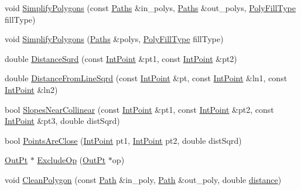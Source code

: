 \begin{DoxyCompactItemize}
\item 
void \mbox{\hyperlink{namespace_clipper_lib_ac9ebbe437e4c08816bffeced6d001cf6}{Simplify\+Polygons}} (const \mbox{\hyperlink{namespace_clipper_lib_a4bab1d9e10805fa6f1fd3b78c56efcfe}{Paths}} \&in\+\_\+polys, \mbox{\hyperlink{namespace_clipper_lib_a4bab1d9e10805fa6f1fd3b78c56efcfe}{Paths}} \&out\+\_\+polys, \mbox{\hyperlink{namespace_clipper_lib_a95a41ff8fa6b351d304829c267d638d7}{Poly\+Fill\+Type}} fill\+Type)
\item 
void \mbox{\hyperlink{namespace_clipper_lib_ac43b677f95d30bd595bbdd5eb79cdcec}{Simplify\+Polygons}} (\mbox{\hyperlink{namespace_clipper_lib_a4bab1d9e10805fa6f1fd3b78c56efcfe}{Paths}} \&polys, \mbox{\hyperlink{namespace_clipper_lib_a95a41ff8fa6b351d304829c267d638d7}{Poly\+Fill\+Type}} fill\+Type)
\item 
double \mbox{\hyperlink{namespace_clipper_lib_ab3ea29b9e123ab56ede03ce6946c9e7d}{Distance\+Sqrd}} (const \mbox{\hyperlink{struct_clipper_lib_1_1_int_point}{Int\+Point}} \&pt1, const \mbox{\hyperlink{struct_clipper_lib_1_1_int_point}{Int\+Point}} \&pt2)
\item 
double \mbox{\hyperlink{namespace_clipper_lib_ac57923512d57903663fed9778585ca18}{Distance\+From\+Line\+Sqrd}} (const \mbox{\hyperlink{struct_clipper_lib_1_1_int_point}{Int\+Point}} \&pt, const \mbox{\hyperlink{struct_clipper_lib_1_1_int_point}{Int\+Point}} \&ln1, const \mbox{\hyperlink{struct_clipper_lib_1_1_int_point}{Int\+Point}} \&ln2)
\item 
bool \mbox{\hyperlink{namespace_clipper_lib_a6a8d461810e4bcb5c67bf8e3026839b6}{Slopes\+Near\+Collinear}} (const \mbox{\hyperlink{struct_clipper_lib_1_1_int_point}{Int\+Point}} \&pt1, const \mbox{\hyperlink{struct_clipper_lib_1_1_int_point}{Int\+Point}} \&pt2, const \mbox{\hyperlink{struct_clipper_lib_1_1_int_point}{Int\+Point}} \&pt3, double dist\+Sqrd)
\item 
bool \mbox{\hyperlink{namespace_clipper_lib_a52757887bc031d0052ae95dccb83cd2c}{Points\+Are\+Close}} (\mbox{\hyperlink{struct_clipper_lib_1_1_int_point}{Int\+Point}} pt1, \mbox{\hyperlink{struct_clipper_lib_1_1_int_point}{Int\+Point}} pt2, double dist\+Sqrd)
\item 
\mbox{\hyperlink{struct_clipper_lib_1_1_out_pt}{Out\+Pt}} $\ast$ \mbox{\hyperlink{namespace_clipper_lib_a5d4e245ecf47a87cf3c88876f55ab3a3}{Exclude\+Op}} (\mbox{\hyperlink{struct_clipper_lib_1_1_out_pt}{Out\+Pt}} $\ast$op)
\item 
void \mbox{\hyperlink{namespace_clipper_lib_a9246a3146ac112581e82be58e158be7b}{Clean\+Polygon}} (const \mbox{\hyperlink{namespace_clipper_lib_af39c8fe00f278f18cc8142fef41242da}{Path}} \&in\+\_\+poly, \mbox{\hyperlink{namespace_clipper_lib_af39c8fe00f278f18cc8142fef41242da}{Path}} \&out\+\_\+poly, double \mbox{\hyperlink{unwrapping_8cc_ac6bcc6db62057bda0b6195a11578fdfa}{distance}})

\end{DoxyCompactItemize}
